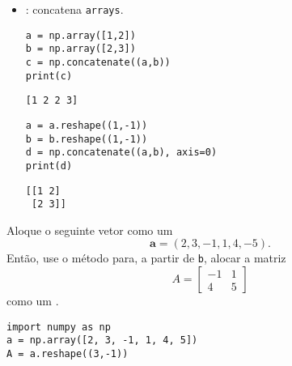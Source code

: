 \begin{itemize}
\begin{verbatim}
[[1 3]
 [2 4]]
\end{verbatim}

\item \hl{\PYTHONnumpyDOTconcatenate}: concatena \texttt{arrays}.

\begin{lstlisting}
a = np.array([1,2])
b = np.array([2,3])
c = np.concatenate((a,b))
print(c)
\end{lstlisting}

\begin{verbatim}
[1 2 2 3]
\end{verbatim}

\begin{lstlisting}
a = a.reshape((1,-1))
b = b.reshape((1,-1))
d = np.concatenate((a,b), axis=0)
print(d)
\end{lstlisting}

\begin{verbatim}
[[1 2]
 [2 3]]
\end{verbatim}

  \end{itemize}

\begin{exer}
  Aloque o seguinte vetor como um {\PYTHONnumpyDOTarray}
  \begin{equation}
    \pmb{a} = (2, 3, -1, 1, 4, -5). 
  \end{equation}
  Então, use o método {\PYTHONnumpyDOTreshape} para, a partir de \texttt{b}, alocar a matriz
  \begin{equation}
    A = \begin{bmatrix}
      -1 & 1 \\
      4 & 5
    \end{bmatrix}
  \end{equation}
  como um {\PYTHONnumpyDOTarray}.
\end{exer}
\begin{resp}
  
\begin{lstlisting}
import numpy as np
a = np.array([2, 3, -1, 1, 4, 5])
A = a.reshape((3,-1))
\end{lstlisting}

\end{resp}

